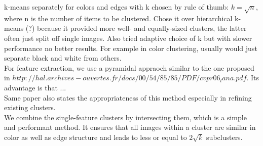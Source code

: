 k-means separately for colors and edges with k chosen by rule of thumb: $ k = \sqrt{n} $, where n is the number of items to be clustered. Chose it over hierarchical k-means (?) because it provided more well- and equally-sized clusters, the latter often just split off single images.
Also tried adaptive choice of k but with slower performance no better results. For example in color clustering, usually would just separate black and white from others.\\
For feature extraction, we use a pyramidal appraoch similar to the one proposed in  $http://hal.archives-ouvertes.fr/docs/00/54/85/85/PDF/cvpr06_lana.pdf$. Its advantage is that ... \\
Same paper also states the appropriateness of this method especially in refining existing clusters.\\
We combine the single-feature clusters by intersecting them, which is a simple and performant method. It ensures that all images within a cluster are similar in color as well as edge structure and leads to less or equal to $ 2\sqrt{k} $ subclusters.

